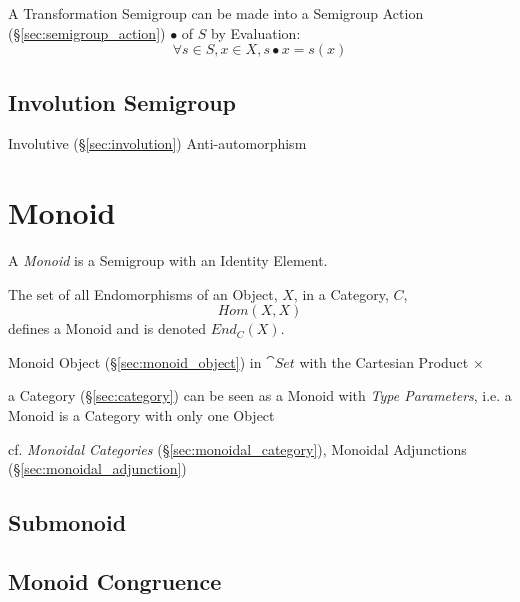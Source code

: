 A Transformation Semigroup can be made into a Semigroup Action
(\S\ref{sec:semigroup_action}) $\bullet$ of $S$ by Evaluation:
\[
  \forall s \in S, x \in X, s \bullet x = s(x)
\]



\subsection{Involution Semigroup}\label{sec:involution_semigroup}

Involutive (\S\ref{sec:involution}) Anti-automorphism



\section{Monoid}\label{sec:monoid}

A \emph{Monoid} is a Semigroup with an Identity Element.

The set of all Endomorphisms of an Object, $X$, in a Category, $C$,
\[
    Hom(X,X)
\]
defines a Monoid and is denoted $End_C(X)$.

Monoid Object (\S\ref{sec:monoid_object}) in $\cat{Set}$ with the
Cartesian Product $\times$

a Category (\S\ref{sec:category}) can be seen as a Monoid with \emph{Type
  Parameters}, i.e. a Monoid is a Category with only one Object

\fist cf. \emph{Monoidal Categories} (\S\ref{sec:monoidal_category}),
Monoidal Adjunctions (\S\ref{sec:monoidal_adjunction})



\subsection{Submonoid}\label{sec:submonoid}

\subsection{Monoid Congruence}\label{sec:monoid_congruence}


